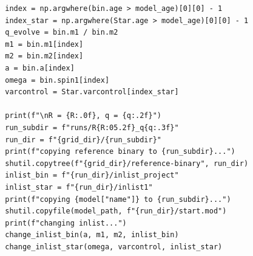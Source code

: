 \documentclass[a4paper,10pt]{article}
\begin{document}
\begin{verbatim}
        index = np.argwhere(bin.age > model_age)[0][0] - 1
        index_star = np.argwhere(Star.age > model_age)[0][0] - 1
        q_evolve = bin.m1 / bin.m2
        m1 = bin.m1[index]
        m2 = bin.m2[index]
        a = bin.a[index]
        omega = bin.spin1[index]
        varcontrol = Star.varcontrol[index_star]

        print(f"\nR = {R:.0f}, q = {q:.2f}")
        run_subdir = f"runs/R{R:05.2f}_q{q:.3f}"
        run_dir = f"{grid_dir}/{run_subdir}"
        print(f"copying reference binary to {run_subdir}...")
        shutil.copytree(f"{grid_dir}/reference-binary", run_dir)
        inlist_bin = f"{run_dir}/inlist_project"
        inlist_star = f"{run_dir}/inlist1"
        print(f"copying {model["name"]} to {run_subdir}...")
        shutil.copyfile(model_path, f"{run_dir}/start.mod")
        print(f"changing inlist...")
        change_inlist_bin(a, m1, m2, inlist_bin)
        change_inlist_star(omega, varcontrol, inlist_star)
\end{verbatim}

\label{fig:compare}
\begin{figure}[ht]
    \centering
\end{figure}
\begin{figure}[ht]
    \centering
\end{figure}

\begin{figure}[ht]
    \centering
\end{figure}
\end{document}
